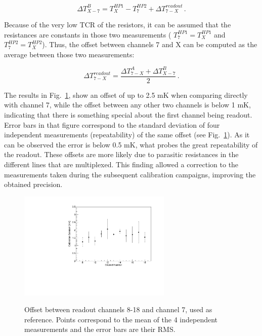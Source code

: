     \begin{equation}
        \Delta T_{X-7}^B = T_{X}^{HP1}-T_{7}^{HP2}+\Delta T_{7-X}^{readout} \, .
    \end{equation}  

\noindent 
Because of the very low TCR of the resistors, it can be assumed that the resistances are constants in those two measurements ( $T_{7}^{HP1}=T_{X}^{HP1}$ and $T_{7}^{HP2}=T_{X}^{HP2}$). Thus, the offset between channels 7 and X can be computed as the average between those two measurements: 

\begin{equation}
    \Delta T_{7-X}^{readout} = \frac{\Delta T^{A}_{7-X} + \Delta T^{B}_{X-7}}{2} \, .
\end{equation}

The results in Fig.~\ref{fig:readout_calib}, show an offset of up to 2.5 mK when comparing directly with channel 7, while the offset between any other two channels is below 1 mK, indicating that there is something special about the first channel being readout. Error bars in that figure correspond to the standard deviation of four independent measurements (repeatability) of the same offset (see Fig.~\ref{fig:readout_calib}). As it can be observed the error is below 0.5 mK, what probes the great repeatability of the readout. These offsets are more likely due to parasitic resistances in the different lines that are multiplexed. This finding allowed a correction to the measurements taken during the subsequent calibration campaigns, improving the obtained precision. 

\begin{figure}[htbp]
\centering
{\includegraphics[width=0.65\textwidth]{images/figure_3.pdf}}
\caption{Offset between readout channels 8-18 and channel 7, used as reference. Points correspond to the mean of the 4 independent measurements and the error bars are their RMS.}
\label{fig:readout_calib}
\end{figure}
